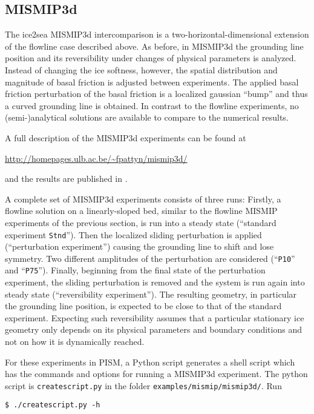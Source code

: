 \subsection{MISMIP3d}\label{subsect:MISMIP3d}
The ice2sea MISMIP3d intercomparison is a two-horizontal-dimensional extension of the flowline case described above.  As before, in MISMIP3d the grounding line position and its reversibility under changes of physical parameters is analyzed.  Instead of changing the ice softness, however, the spatial distribution and magnitude of basal friction is adjusted between experiments.  The applied basal friction perturbation of the basal friction is a localized gaussian ``bump'' and thus a curved grounding line is obtained.  In contrast to the flowline experiments, no (semi-)analytical solutions are available to compare to the numerical results.

A full description of the MISMIP3d experiments can be found at

\centerline{\url{http://homepages.ulb.ac.be/~fpattyn/mismip3d/}}

\noindent and the results are published in \cite{MISMIP3d2013}.

A complete set of MISMIP3d experiments consists of three runs: Firstly, a flowline solution on a linearly-sloped bed, similar to the flowline MISMIP experiments of the previous section, is run into a steady state (``standard experiment \texttt{Stnd}'').  Then the localized sliding perturbation is applied (``perturbation experiment'')  causing the grounding line to shift and lose symmetry.  Two different amplitudes of the perturbation are considered (``\texttt{P10}'' and ``\texttt{P75}'').  Finally, beginning from the final state of the perturbation experiment, the sliding perturbation is removed and the system is run again into steady state (``reversibility experiment'').  The resulting geometry, in particular the grounding line position, is expected to be close to that of the standard experiment.  Expecting such reversibility assumes that a particular stationary ice geometry only depends on its physical parameters and boundary conditions and not on how it is dynamically reached.

For these experiments in PISM, a Python script generates a shell script which has the commands and options for running a MISMIP3d experiment.  The python script is \texttt{createscript.py} in the folder \texttt{examples/mismip/mismip3d/}.  Run

\begin{verbatim}
$ ./createscript.py -h
\end{verbatim}

